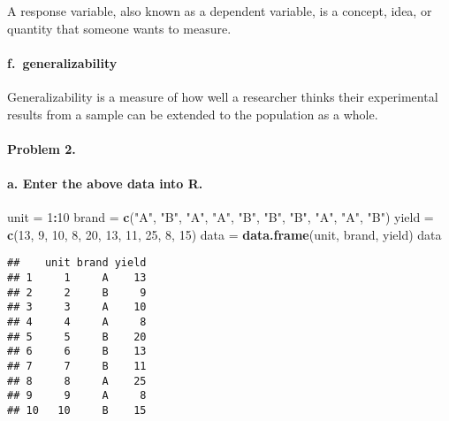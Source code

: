 \documentclass[
]{article}
\newenvironment{Shaded}{\begin{snugshade}}{\end{snugshade}}
\newcommand{\DecValTok}[1]{\textcolor[rgb]{0.00,0.00,0.81}{#1}}
\newcommand{\KeywordTok}[1]{\textcolor[rgb]{0.13,0.29,0.53}{\textbf{#1}}}
\newcommand{\NormalTok}[1]{#1}
\newcommand{\OperatorTok}[1]{\textcolor[rgb]{0.81,0.36,0.00}{\textbf{#1}}}
\newcommand{\StringTok}[1]{\textcolor[rgb]{0.31,0.60,0.02}{#1}}
\begin{document}
A response variable, also known as a dependent variable, is a concept,
idea, or quantity that someone wants to measure.

\hypertarget{f.-generalizability}{%
\paragraph{f.~generalizability}\label{f.-generalizability}}

Generalizability is a measure of how well a researcher thinks their
experimental results from a sample can be extended to the population as
a whole.

\hypertarget{problem-2.}{%
\paragraph{Problem 2.}\label{problem-2.}}

\hypertarget{a.-enter-the-above-data-into-r.}{%
\paragraph{a. Enter the above data into
R.}\label{a.-enter-the-above-data-into-r.}}

\begin{Shaded}
\begin{Highlighting}[]
\NormalTok{unit =}\StringTok{ }\DecValTok{1}\OperatorTok{:}\DecValTok{10}
\NormalTok{brand =}\StringTok{ }\KeywordTok{c}\NormalTok{(}\StringTok{"A"}\NormalTok{, }\StringTok{"B"}\NormalTok{, }\StringTok{"A"}\NormalTok{, }\StringTok{"A"}\NormalTok{, }\StringTok{"B"}\NormalTok{, }\StringTok{"B"}\NormalTok{, }\StringTok{"B"}\NormalTok{, }\StringTok{"A"}\NormalTok{, }\StringTok{"A"}\NormalTok{, }\StringTok{"B"}\NormalTok{) }
\NormalTok{yield =}\StringTok{ }\KeywordTok{c}\NormalTok{(}\DecValTok{13}\NormalTok{, }\DecValTok{9}\NormalTok{, }\DecValTok{10}\NormalTok{, }\DecValTok{8}\NormalTok{, }\DecValTok{20}\NormalTok{, }\DecValTok{13}\NormalTok{, }\DecValTok{11}\NormalTok{, }\DecValTok{25}\NormalTok{, }\DecValTok{8}\NormalTok{, }\DecValTok{15}\NormalTok{)}
\NormalTok{data =}\StringTok{ }\KeywordTok{data.frame}\NormalTok{(unit, brand, yield)}
\NormalTok{data}
\end{Highlighting}
\end{Shaded}

\begin{verbatim}
##    unit brand yield
## 1     1     A    13
## 2     2     B     9
## 3     3     A    10
## 4     4     A     8
## 5     5     B    20
## 6     6     B    13
## 7     7     B    11
## 8     8     A    25
## 9     9     A     8
## 10   10     B    15
\end{verbatim}
\end{document}
